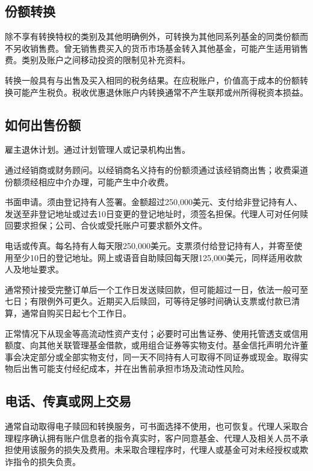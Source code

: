 \documentclass[UTF8,fontset=none,11pt,a4paper]{ctexart}
\begin{document}
\subsection*{份额转换}
除不享有转换特权的类别及其他明确例外，可转换为其他同系列基金的同类份额而不另收销售费。曾无销售费买入的货币市场基金转入其他基金，可能产生适用销售费。类别及账户之间移动投资的限制见\allowbreak\mbox{补充资料。}


转换一般具有与出售及买入相同的税务结果。在应税账户，价值高于成本的份额转换可能产生税负。税收优惠退休账户内转换通常不产生联邦或州所得税\allowbreak\mbox{资本损益。}


\subsection*{如何出售份额}
雇主退休计划。通过计划管理人或记录\allowbreak\mbox{机构出售。}


通过经销商或财务顾问。以经销商名义持有的份额须通过该经销商出售；收费渠道份额须经相应中介办理，可能产生\allowbreak\mbox{中介收费。}


书面申请。须由登记持有人签署。金额超过250,000美元、支付给非登记持有人、发送至非登记地址或过去10日变更的登记地址时，须签名担保。代理人可对任何赎回要求担保；公司、合伙或受托账户可要求\allowbreak\mbox{额外文件。}


电话或传真。每名持有人每天限250,000美元。支票须付给登记持有人，并寄至使用至少10日的登记地址。网上或语音自助赎回每天限125,000美元，同样适用收款人及\allowbreak\mbox{地址要求。}


通常预计接受完整订单后一个工作日发送赎回款，但可能超过一日，依法一般可至七日；有限例外可更久。近期买入后赎回，可等待足够时间确认支票或付款已清算，通常自购买日起七\allowbreak\mbox{个工作日。}


正常情况下从现金等高流动性资产支付；必要时可出售证券、使用托管透支或信用额度、向其他关联管理基金借款，或用组合证券等实物支付。基金信托声明允许董事会决定部分或全部实物支付，同一天不同持有人可取得不同证券或现金。取得实物后出售可能支付经纪成本，并在出售前承担市场及流\allowbreak\mbox{动性风险。}


\subsection*{电话、传真或网上交易}
通常自动取得电子赎回和转换服务，可书面选择不使用，也可恢复。代理人采取合理程序确认拥有账户信息者的指令真实时，客户同意基金、代理人及相关人员不承担使用该服务的损失及费用。未采取合理程序时，代理人或基金可对未经授权或欺诈指令的\allowbreak\mbox{损失负责。}
\end{document}

